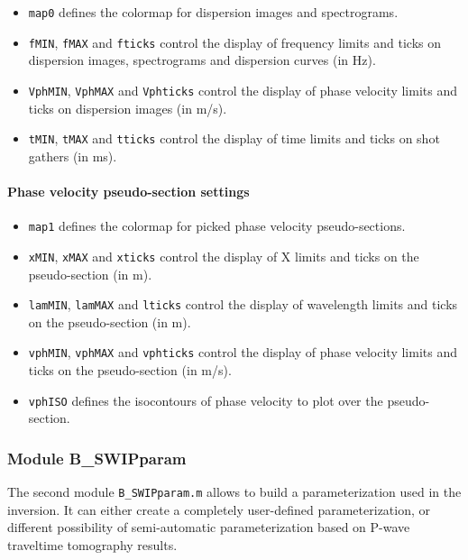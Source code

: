 \documentclass[twoside,a4paper]{article}
\begin{document}
\begin{itemize}[leftmargin=*]
\item \verb|map0| defines the colormap for dispersion images and spectrograms.

\item \verb|fMIN|, \verb|fMAX| and \verb|fticks| control the display of frequency limits and ticks on dispersion images, spectrograms and dispersion curves (in Hz).

\item \verb|VphMIN|, \verb|VphMAX| and \verb|Vphticks| control the display of phase velocity limits and ticks on dispersion images (in m/s).

\item \verb|tMIN|, \verb|tMAX| and \verb|tticks| control the display of time limits and ticks on shot gathers (in ms).
\end{itemize}

\paragraph{Phase velocity pseudo-section settings}
\begin{itemize}[leftmargin=*]
\setlength\itemsep{2ex}
\item \verb|map1| defines the colormap for picked phase velocity pseudo-sections.

\item \verb|xMIN|, \verb|xMAX| and \verb|xticks| control the display of X limits and ticks on the pseudo-section (in m).

\item \verb|lamMIN|, \verb|lamMAX| and \verb|lticks| control the display of wavelength limits and ticks on the pseudo-section (in m).

\item \verb|vphMIN|, \verb|vphMAX| and \verb|vphticks| control the display of phase velocity limits and ticks on the pseudo-section (in m/s).

\item \verb|vphISO| defines the isocontours of phase velocity to plot over the pseudo-section.
\end{itemize}

\subsubsection{Module B\_SWIPparam}
The second module \verb|B_SWIPparam.m| allows to build a parameterization used in the inversion. It can either create a completely user-defined parameterization, or different possibility of semi-automatic parameterization based on P-wave traveltime tomography results.
\end{document}
